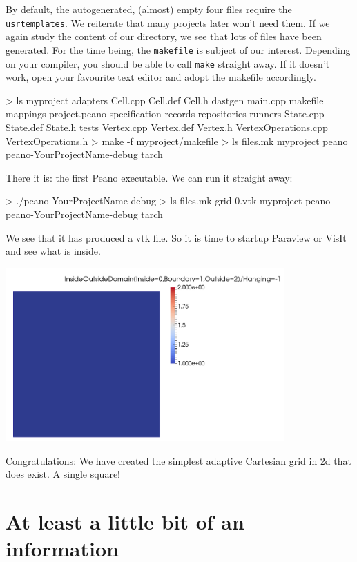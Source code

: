 \noindent
By default, the autogenerated, (almost) empty four files require the
\texttt{usrtemplates}.
We reiterate that many projects later won't need them.
If we again study the content of our directory, we see that lots of files have
been generated.
For the time being, the \texttt{makefile} is subject of our interest.
Depending on your compiler, you should be able to call \texttt{make} straight
away. 
If it doesn't work, open your favourite text editor and adopt the makefile
accordingly.
\begin{code}
> ls myproject
  adapters   Cell.cpp              Cell.def      
  Cell.h     dastgen               main.cpp     
  makefile   mappings              project.peano-specification  
  records    repositories          runners 
  State.cpp  State.def             State.h
  tests      Vertex.cpp            Vertex.def    
  Vertex.h   VertexOperations.cpp  VertexOperations.h
> make -f myproject/makefile
> ls
  files.mk  myproject  peano  peano-YourProjectName-debug  tarch
\end{code}


\noindent
There it is: the first Peano executable. We can run it straight away:
\begin{code}
> ./peano-YourProjectName-debug
> ls
  files.mk                     grid-0.vtk  myproject  peano  
  peano-YourProjectName-debug  tarch
\end{code}

\noindent
We see that it has produced a vtk file. So it is time to startup Paraview or
VisIt and see what is inside.

\begin{center}
  \includegraphics[width=0.8\textwidth]{10_quickstart/screenshot00.png}
\end{center}

\noindent
Congratulations: We have created the simplest adaptive Cartesian grid in 2d that
does exist. A single square!


\section{At least a little bit of an information}

